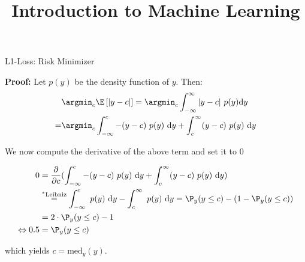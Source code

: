 \documentclass[11pt,compress,t,notes=noshow, xcolor=table]{beamer}
\title{Introduction to Machine Learning}
\begin{document}

\begin{frame2}[footnotesize]{L1-Loss: Risk Minimizer}

\textbf{Proof:} Let $p(y)$ be the density function of $y$. Then: 
\begin{align*}
&\argmin_c \E\left[|y - c|\right] = \argmin_c \int_{-\infty}^\infty |y - c| ~ p(y) \text{d}y \\
=& \argmin_c \int_{-\infty}^c -(y - c)~p(y)~\text{d}y + \int_c^\infty (y - c)~p(y)~\text{d}y 
\end{align*}

We now compute the derivative of the above term and set it to $0$

\begin{align*}
0 &= \frac{\partial}{\partial c} (\int_{-\infty}^c -(y - c)~p(y)~\text{d}y + \int_c^\infty (y - c)~p(y)~\text{d}y) \\ &\overset{^\ast\text{Leibniz}}{=} \int_{-\infty}^c  ~p(y)~\text{d}y - \int_c^\infty ~p(y)~\text{d}y =   \P_y (y \le c) - (1 - \P_y (y \le c)) \\
&= 2 \cdot \P_y (y \le c) - 1 \\
\Leftrightarrow 0.5 &= \P_y (y \le c)
\end{align*}

which yields $c = \text{med}_y(y)$. 

\end{frame2}
\end{document}
